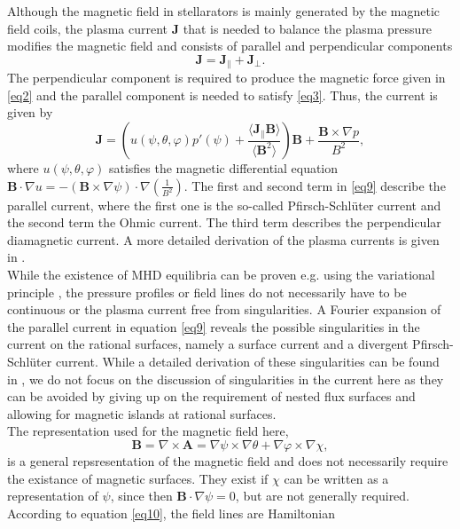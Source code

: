 Although the magnetic field in stellarators is mainly generated by the magnetic field coils, the plasma current \textbf{J} that is needed to balance the plasma pressure modifies the magnetic field and consists of parallel and perpendicular components
\begin{equation}
    \textbf{J} = \textbf{J}_{\parallel} + \textbf{J}_{\perp}.
\end{equation}
The perpendicular component is required to produce the magnetic force given in \ref{eq2} and the parallel component is needed to satisfy \ref{eq3}. Thus, the current is given by
\begin{equation}
    \textbf{J} = (u(\psi, \theta, \varphi)p'(\psi)+\frac{\langle \textbf{J}_{\parallel}\textbf{B}\rangle}{\langle \textbf{B}^2\rangle}) \textbf{B}+\frac{\textbf{B} \times \nabla p}{B^2}, \label{eq9}
\end{equation}
where $u(\psi, \theta, \varphi)$ satisfies the magnetic differential equation $\textbf{B}\cdot \nabla u = -(\textbf{B}\times \nabla \psi) \cdot \nabla (\frac{1}{B^2})$. The first and second term in \ref{eq9} describe the parallel current, where the first one is the so-called Pfirsch-Schlüter current and the second term the Ohmic current. The third term describes the perpendicular diamagnetic current. A more detailed derivation of the plasma currents is given in \cite{Chen2012}. \\
While the existence of MHD equilibria \cite{Moffatt1985} can be proven e.g. using the variational principle \cite{Helander2014}, the pressure profiles or field lines do not necessarily have to be continuous or the plasma current free from singularities. A Fourier expansion of the parallel current in equation \ref{eq9} reveals the possible singularities in the current on the rational surfaces, namely a surface current and a divergent Pfirsch-Schlüter current. While a detailed derivation of these singularities can be found in \cite{Helander2014}, we do not focus on the discussion of singularities in the current here as they can be avoided by giving up on the requirement of nested flux surfaces and allowing for magnetic islands at rational surfaces. \\
The representation used for the magnetic field here,
\begin{equation}
    \textbf{B} = \nabla \times \textbf{A} = \nabla \psi \times \nabla \theta + \nabla \varphi \times \nabla \chi, \label{eq10}
\end{equation}
is a general repsresentation of the magnetic field and does not necessarily require the existance of magnetic surfaces.  They exist if $\chi$ can be written as a representation of $\psi$, since then $\textbf{B} \cdot \nabla \psi = 0$, but are not generally required. According to equation \ref{eq10}, the field lines are Hamiltonian
